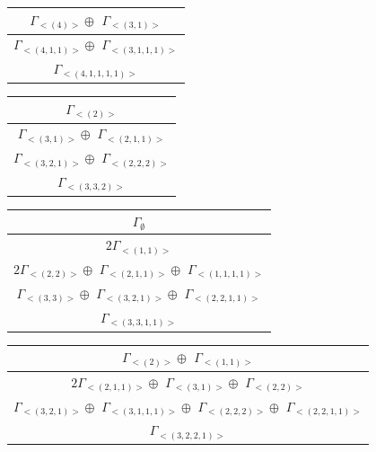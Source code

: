 \begin{minipage}{.28\textwidth}
\centering
\begin{tabular}{|c|}\hline
$\Gamma_{<(
4
)>} \oplus$
$\Gamma_{<(
3 , 
1
)>}$
\\ \hline
$\Gamma_{<(
4 , 
1 , 
1
)>} \oplus$
$\Gamma_{<(
3 , 
1 , 
1 , 
1
)>}$
\\ \hline
$\Gamma_{<(
4 , 
1 , 
1 , 
1 , 
1
)>}$
\\
\hline\end{tabular}\end{minipage}
\begin{minipage}{.26\textwidth}
\centering
\begin{tabular}{|c|}\hline
$\Gamma_{<(
2
)>}$
\\ \hline
$\Gamma_{<(
3 , 
1
)>} \oplus$
$\Gamma_{<(
2 , 
1 , 
1
)>}$
\\ \hline
$\Gamma_{<(
3 , 
2 , 
1
)>} \oplus$
$\Gamma_{<(
2 , 
2 , 
2
)>}$
\\ \hline
$\Gamma_{<(
3 , 
3 , 
2
)>}$
\\
\hline\end{tabular}\end{minipage}
\bigskip
\begin{minipage}{.4\textwidth}
\centering
\begin{tabular}{|c|}\hline
$\Gamma_\emptyset$
\\ \hline
$ 2 \Gamma_{<(
1 , 
1
)>}$
\\ \hline
$ 2 \Gamma_{<(
2 , 
2
)>} \oplus$
$\Gamma_{<(
2 , 
1 , 
1
)>} \oplus$
$\Gamma_{<(
1 , 
1 , 
1 , 
1
)>}$
\\ \hline
$\Gamma_{<(
3 , 
3
)>} \oplus$
$\Gamma_{<(
3 , 
2 , 
1
)>} \oplus$
$\Gamma_{<(
2 , 
2 , 
1 , 
1
)>}$
\\ \hline
$\Gamma_{<(
3 , 
3 , 
1 , 
1
)>}$
\\
\hline\end{tabular}\end{minipage}
\begin{minipage}{.6\textwidth}
\centering
\begin{tabular}{|c|}\hline
$\Gamma_{<(
2
)>} \oplus$
$\Gamma_{<(
1 , 
1
)>}$
\\ \hline
$ 2 \Gamma_{<(
2 , 
1 , 
1
)>} \oplus$
$\Gamma_{<(
3 , 
1
)>} \oplus$
$\Gamma_{<(
2 , 
2
)>}$
\\ \hline
$\Gamma_{<(
3 , 
2 , 
1
)>} \oplus$
$\Gamma_{<(
3 , 
1 , 
1 , 
1
)>} \oplus$
$\Gamma_{<(
2 , 
2 , 
2
)>} \oplus$
$\Gamma_{<(
2 , 
2 , 
1 , 
1
)>}$
\\ \hline
$\Gamma_{<(
3 , 
2 , 
2 , 
1
)>}$
\\
\hline\end{tabular}\end{minipage}
